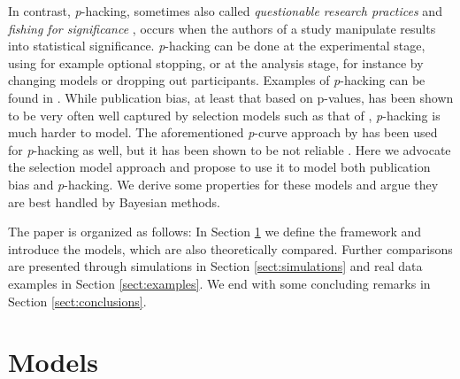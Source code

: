 \documentclass[useAMS,usenatbib,referee]{biom}
\begin{document}
In contrast, \textit{p}-hacking, sometimes also called \emph{questionable research practices} \citep{Sijtsma2016} and \emph{fishing for significance} \citep{Boulesteix2009}, occurs when the authors of a study manipulate results into statistical significance. \textit{p}-hacking can be done at the experimental stage, using for example optional stopping, or at the analysis stage, for instance by changing models or dropping out participants. Examples of \textit{p}-hacking can be found in \citet{simmons2011false}. While publication bias, at least that based on p-values, has been shown to be very often well captured by selection models such as that of \citet{hedges1992modeling} \citep[see the aforementiond study of][]{carter2019correcting}, \textit{p}-hacking is much harder to model. The aforementioned \textit{p}-curve approach by \citet{simonsohn2014p} has been used for \textit{p}-hacking as well, but it has been shown to be not reliable \citep{BrunsIoannidis2016}. Here we advocate the selection model approach and propose to use it to model both publication bias and \textit{p}-hacking. We derive some properties for these models and argue they are best handled by Bayesian methods. 

The paper is organized as follows: In Section \ref{sect:models} we define the framework and introduce the models, which are also theoretically compared. Further comparisons are presented through simulations in Section \ref{sect:simulations} and real data examples in Section \ref{sect:examples}. We end with some concluding remarks in Section \ref{sect:conclusions}.

\section{Models}\label{sect:models}
\end{document}
